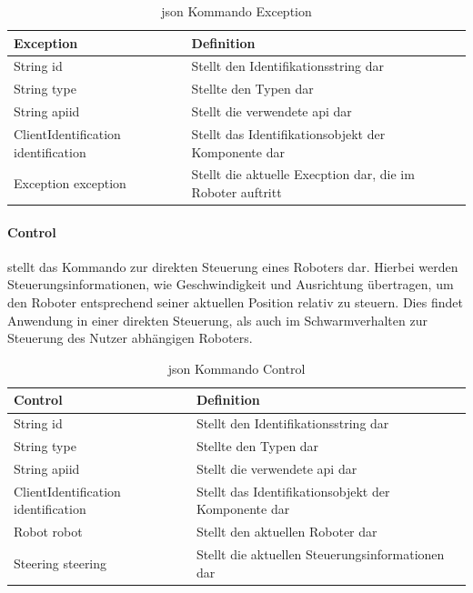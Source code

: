 \begin{table}[h]
	\centering
	\begin{tabular}{|p{4cm}|p{8cm}|}
		\hline
		\textbf{Exception} & Definition\\
		\hline
		String id & Stellt den Identifikationsstring dar \\
		String type & Stellte den Typen dar \\
		String apiid & Stellt die verwendete \gls{api} dar \\
		ClientIdentification identification & Stellt das Identifikationsobjekt der Komponente dar \\
		Exception exception & Stellt die aktuelle Execption dar, die im Roboter auftritt \\
		\hline
	\end{tabular}
	\caption[\gls{json} Kommando Exception]{\gls{json} Kommando Exception}
	\label{tab:Exception}
\end{table}

\newpage
\paragraph{Control} stellt das Kommando zur direkten Steuerung eines Roboters dar. Hierbei werden Steuerungsinformationen, wie Geschwindigkeit und Ausrichtung übertragen, um den Roboter entsprechend seiner aktuellen Position relativ zu steuern. Dies findet Anwendung in einer direkten Steuerung, als auch im Schwarmverhalten zur Steuerung des Nutzer abhängigen Roboters.

\begin{table}[h]
	\centering
	\begin{tabular}{|p{4cm}|p{8cm}|}
		\hline
		\textbf{Control} & Definition\\
		\hline
		String id & Stellt den Identifikationsstring dar \\
		String type & Stellte den Typen dar \\
		String apiid & Stellt die verwendete \gls{api} dar \\
		ClientIdentification identification & Stellt das Identifikationsobjekt der Komponente dar \\
		Robot robot & Stellt den aktuellen Roboter dar\\
		Steering steering & Stellt die aktuellen Steuerungsinformationen dar \\
		\hline
	\end{tabular}
	\caption[\gls{json} Kommando Control]{\gls{json} Kommando Control}
	\label{tab:Control}
\end{table}

